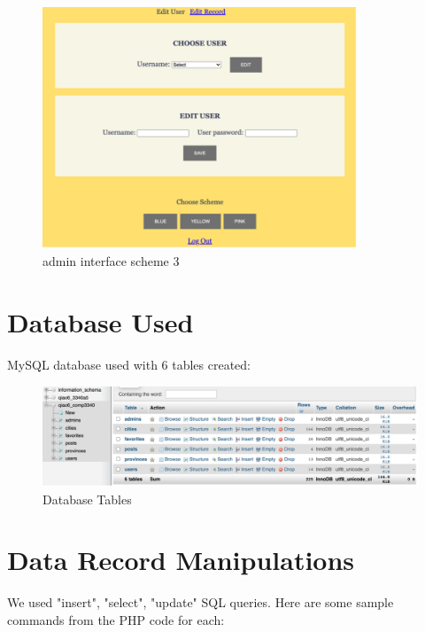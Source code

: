 \documentclass[12pt, letterpaper]{article}
\begin{document}
 \newpage

\begin{figure}[htbp]
	\centering
	\includegraphics[width=3.7in]{images/q14-6.png}
	\caption{admin interface scheme 3}
 \end{figure}
 \newpage

\section{Database Used}
MySQL database used with 6 tables created:

\begin{figure}[htbp]
	\centering
	\includegraphics[width=6in]{images/q15.png}
	\caption{Database Tables}
 \end{figure}

 \newpage

\section{Data Record Manipulations}
We used "insert", "select", "update" SQL queries. 
Here are some sample commands from the PHP code for each:
\end{document}

